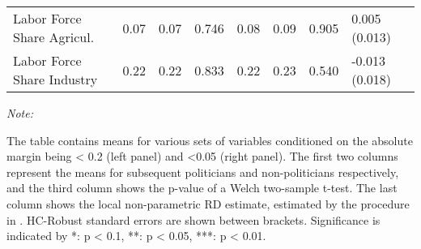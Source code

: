 \begin{table}[!h]
{\begin{threeparttable}
\begin{tabular}[t]{llllllll}
\hspace{1em}Labor Force Share Agricul. & \num{0.07} & \num{0.07} & 0.746 & \num{0.08} & \num{0.09} & 0.905 & 0.005 (0.013)\\
\hspace{1em}Labor Force Share Industry & \num{0.22} & \num{0.22} & 0.833 & \num{0.22} & \num{0.23} & 0.540 & -0.013 (0.018)\\
\bottomrule
\end{tabular}
\begin{tablenotes}[para]
\item \textit{Note: } 
\item The table contains means for various sets of variables conditioned on the absolute margin being < 0.2 (left panel) and <0.05 (right panel). The first two columns represent the means for subsequent politicians and non-politicians respectively, and the third column shows the p-value of a Welch two-sample t-test. The last column shows the local non-parametric RD estimate, estimated by the procedure in \cite{cattaneo2019practical}. HC-Robust standard errors are shown between brackets. Significance is indicated by *: p < 0.1, **: p < 0.05, ***: p < 0.01.
\end{tablenotes}
\end{threeparttable}}
\end{table}

